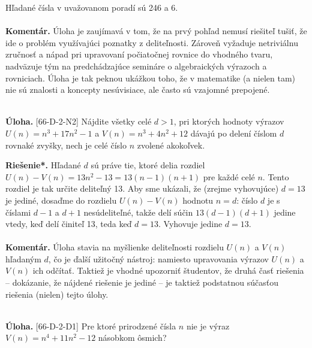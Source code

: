 \documentclass[11pt,a4paper,oneside,final]{book}
\newcommand{\kom}{\textbf{Komentár.} }
\newcommand{\ul}{\textbf{Úloha.} }
\newcommand{\rieh}{\textbf{Riešenie*.} }
\begin{document}
Hľadané čísla v uvažovanom poradí sú 246 a 6.\\
\\
\kom Úloha je zaujímavá v tom, že na prvý pohľad nemusí riešiteľ tušiť, že ide o problém využívajúci poznatky z deliteľnosti. Zároveň vyžaduje netriviálnu zručnosť a nápad pri upravovaní počiatočnej rovnice do vhodného tvaru, nadväzuje tým na predchádzajúce semináre o algebraických výrazoch a rovniciach. Úloha je tak peknou ukážkou toho, že v matematike (a nielen tam) nie sú znalosti a koncepty nesúvisiace, ale často sú vzajomné prepojené.\\
\\
\begin{tcolorbox}[breakable,notitle,boxrule=0pt,colback=light-gray,colframe=light-gray]\ul [66-D-2-N2] Nájdite všetky celé $d > 1$, pri ktorých hodnoty výrazov $U(n) = n^3+ 17n^2-1$ a $V (n) = n^3+ 4n^2+ 12$ dávajú po delení číslom $d$ rovnaké zvyšky, nech je celé číslo $n$ zvolené akokoľvek.

\end{tcolorbox}

\rieh Hľadané $d$ sú práve tie, ktoré delia rozdiel $U(n) - V (n) = 13n^2 - 13 = 13(n - 1)(n + 1)$ pre každé celé $n$. Tento rozdiel je tak určite deliteľný 13. Aby sme ukázali, že (zrejme vyhovujúce) $d = 13$ je jediné, dosaďme do rozdielu $U(n) - V (n)$ hodnotu $n = d$: číslo $d$ je s číslami $d - 1$ a $d + 1$ nesúdeliteľné, takže delí súčin $13(d - 1)(d + 1)$ jedine vtedy, keď delí činiteľ 13, teda keď $d = 13$. Vyhovuje jedine $d = 13$.\\
\\
\kom Úloha stavia na myšlienke deliteľnosti rozdielu $U(n)$ a $V(n)$ hľadaným $d$, čo je ďalší užitočný nástroj: namiesto upravovania výrazov $U(n)$ a $V(n)$ ich odčítať. Taktiež je vhodné upozorniť študentov, že druhá časť riešenia -- dokázanie, že nájdené riešenie je jediné -- je taktiež podstatnou súčasťou riešenia (nielen) tejto úlohy.\\
\\
\begin{tcolorbox}[breakable,notitle,boxrule=0pt,colback=light-gray,colframe=light-gray]\ul [66-D-2-D1] Pre ktoré prirodzené čísla $n$ nie je výraz $V (n) = n^4+ 11n^2 - 12$ násobkom ôsmich?

\end{tcolorbox}
\end{document}
